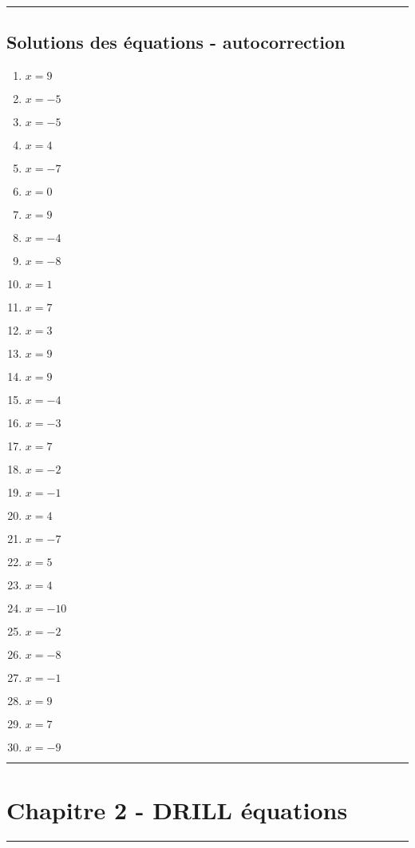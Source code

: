 \documentclass[11pt]{article}
\newcommand{\horrule}[1]{\rule{\linewidth}{#1}} %
\begin{document}
\horrule{1px}

\subsection*{Solutions des équations - autocorrection}


\begin{multicols}{6}
\begin{enumerate}
    \item $x= 9$
    \item $x= -5$
    \item $x= -5$
    \item $x= 4$
    \item $x= -7$
    \item $x= 0$
    \item $x= 9$
    \item $x= -4$
    \item $x= -8$
    \item $x= 1$
    \item $x= 7$
    \item $x= 3$
    \item $x= 9$
    \item $x= 9$
    \item $x= -4$
    \item $x= -3$
    \item $x= 7$
    \item $x= -2$
    \item $x= -1$
    \item $x= 4$
    \item $x= -7$
    \item $x= 5$
    \item $x= 4$
    \item $x= -10$
    \item $x= -2$
    \item $x= -8$
    \item $x= -1$
    \item $x= 9$
    \item $x= 7$
    \item $x= -9$
\end{enumerate}

\end{multicols}
\newpage

\horrule{2px}
\section*{Chapitre 2 - DRILL équations}
\horrule{2px}
\end{document}

